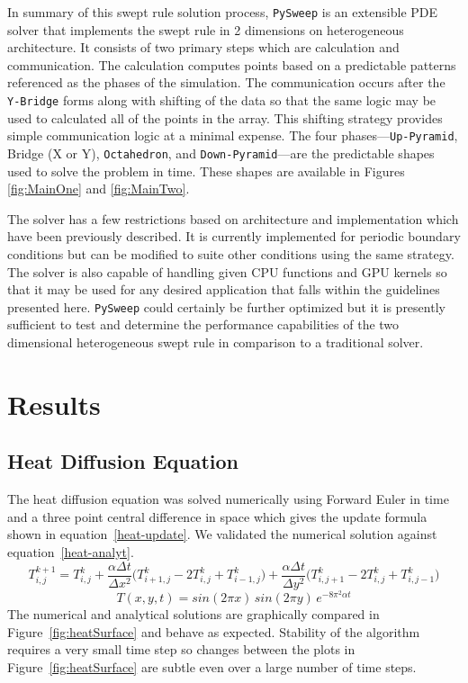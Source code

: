 \documentclass[review]{elsarticle}
\def\pysweep{\texttt{PySweep}}
\def\Up{\texttt{Up-Pyramid}}
\def\Down{\texttt{Down-Pyramid}}
\def\Oct{\texttt{Octahedron}}
\def\Yb{\texttt{Y-Bridge}}
\begin{document}
\par
In summary of this swept rule solution process, \pysweep{} is an extensible PDE solver that implements the swept rule in 2 dimensions on heterogeneous architecture. It consists of two primary steps which are calculation and communication. The calculation computes points based on a predictable patterns referenced as the phases of the simulation. The communication occurs after the \Yb{} forms along with shifting of the data so that the same logic may be used to calculated all of the points in the array. This shifting strategy provides simple communication logic at a minimal expense. The four phases---\Up{}, Bridge (X or Y), \Oct{}, and \Down{}---are the predictable shapes used to solve the problem in time. These shapes are available in Figures \ref{fig:MainOne} and \ref{fig:MainTwo}. 
\par
The solver has a few restrictions based on architecture and implementation which have been previously described. It is currently implemented for periodic boundary conditions but can be modified to suite other conditions using the same strategy. The solver is also capable of handling given CPU functions and GPU kernels so that it may be used for any desired application that falls within the guidelines presented here. \pysweep{} could certainly be further optimized but it is presently sufficient to test and determine the performance capabilities of the two dimensional heterogeneous swept rule in comparison to a traditional solver.

\section{Results}
\label{results-section}

\subsection{Heat Diffusion Equation}
\label{hdeResults}
The heat diffusion equation was solved numerically using Forward Euler in time and a three point central difference in space which gives the update formula shown in equation~\ref{heat-update}. We  validated the numerical solution against equation~\ref{heat-analyt}.
\begin{equation}
    \label{heat-update}
    T_{i,j}^{k+1} = T_{i,j}^{k}+\frac{\alpha \Delta t}{\Delta x^2}\big(T_{i+1,j}^{k}-2T_{i,j}^{k}+T_{i-1,j}^{k}\big)+\frac{\alpha \Delta t}{\Delta y^2}\big(T_{i,j+1}^{k}-2T_{i,j}^{k}+T_{i,j-1}^{k}\big)
\end{equation}
\begin{equation}
\label{heat-analyt}
    T(x,y,t) = sin(2\pi x)\,sin(2\pi y)\,e^{-8\pi^2\alpha t}
\end{equation}
The numerical and analytical solutions are graphically compared in Figure~\ref{fig:heatSurface} and behave as expected. Stability of the algorithm requires a very small time step so changes between the plots in Figure~\ref{fig:heatSurface} are subtle even over a large number of time steps.
\end{document}

